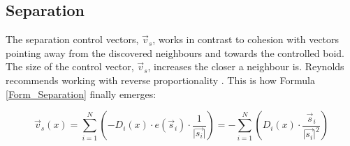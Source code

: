 \documentclass[a4paper, 10pt, journal]{wissarbIEEE}      %
\newcommand{\length}[1]{\lvert \vec{#1} \rvert}
\begin{document}
\subsection{Separation}



The separation control vectors,  $\vec{v}_s$, works in contrast to cohesion with vectors pointing away from the discovered neighbours and towards the controlled boid. The size of the control vector,  $\vec{v}_s$, increases the closer a neighbour is. Reynolds recommends working with reverse proportionality \cite{Reynolds99steeringbehaviors}. This is how Formula \ref{Form_Separation} finally emerges:

\begin{equation}
\vec{v}_s(x) = \sum_{i=1}^N (-D_i(x) \cdot e(\vec{s}_i) \cdot \frac{1}{\length{s_i}}) = - \sum_{i=1}^N(D_i(x) \cdot \frac{\vec{s}_i}{\length{s_i}^2})
\label{Form_Separation}
\end{equation}

\end{document}

